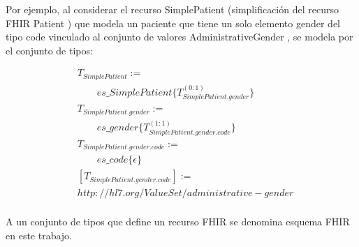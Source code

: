Por ejemplo, al considerar el recurso SimplePatient (simplificación del recurso FHIR Patient \cite{FHIRPatient}) que modela un paciente que tiene un solo elemento gender del tipo code \cite{FHIRDataTypes} vinculado al conjunto de valores AdministrativeGender \cite{FHIRAdministrativeGender}, se modela por el conjunto de tipos:

\begin{align*}
&T_{SimplePatient}:= \\
&\qquad es\_SimplePatient\{T_{SimplePatient.gender}^{(0:1)}\} \\
&T_{SimplePatient.gender}:= \\
&\qquad es\_gender\{T_{SimplePatient.gender.code}^{(1:1)}\} \\
&T_{SimplePatient.gender.code}:= \\
&\qquad es\_code\{\epsilon\} \\
&[T_{SimplePatient.gender.code}] := \\
& http://hl7.org/ValueSet/administrative-gender \\
\end{align*}

A un conjunto de tipos que define un recurso FHIR se denomina esquema FHIR en este trabajo.
